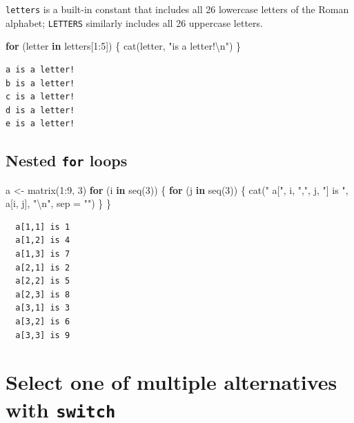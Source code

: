 \documentclass[
]{book}
\newenvironment{Shaded}{\begin{snugshade}}{\end{snugshade}}
\newcommand{\AttributeTok}[1]{\textcolor[rgb]{0.77,0.63,0.00}{#1}}
\newcommand{\ControlFlowTok}[1]{\textcolor[rgb]{0.13,0.29,0.53}{\textbf{#1}}}
\newcommand{\DecValTok}[1]{\textcolor[rgb]{0.00,0.00,0.81}{#1}}
\newcommand{\FunctionTok}[1]{\textcolor[rgb]{0.00,0.00,0.00}{#1}}
\newcommand{\NormalTok}[1]{#1}
\newcommand{\OtherTok}[1]{\textcolor[rgb]{0.56,0.35,0.01}{#1}}
\newcommand{\SpecialCharTok}[1]{\textcolor[rgb]{0.00,0.00,0.00}{#1}}
\newcommand{\StringTok}[1]{\textcolor[rgb]{0.31,0.60,0.02}{#1}}
\begin{document}
\texttt{letters} is a built-in constant that includes all 26 lowercase letters of the Roman alphabet; \texttt{LETTERS} similarly includes all 26 uppercase letters.

\begin{Shaded}
\begin{Highlighting}[]
\ControlFlowTok{for}\NormalTok{ (letter }\ControlFlowTok{in}\NormalTok{ letters[}\DecValTok{1}\SpecialCharTok{:}\DecValTok{5}\NormalTok{]) \{}
  \FunctionTok{cat}\NormalTok{(letter, }\StringTok{"is a letter!}\SpecialCharTok{\textbackslash{}n}\StringTok{"}\NormalTok{)}
\NormalTok{\}}
\end{Highlighting}
\end{Shaded}

\begin{verbatim}
a is a letter!
b is a letter!
c is a letter!
d is a letter!
e is a letter!
\end{verbatim}

\hypertarget{nested-for-loops}{%
\subsection{\texorpdfstring{Nested \texttt{for} loops}{Nested for loops}}\label{nested-for-loops}}

\begin{Shaded}
\begin{Highlighting}[]
\NormalTok{a }\OtherTok{\textless{}{-}} \FunctionTok{matrix}\NormalTok{(}\DecValTok{1}\SpecialCharTok{:}\DecValTok{9}\NormalTok{, }\DecValTok{3}\NormalTok{)}
\ControlFlowTok{for}\NormalTok{ (i }\ControlFlowTok{in} \FunctionTok{seq}\NormalTok{(}\DecValTok{3}\NormalTok{)) \{}
  \ControlFlowTok{for}\NormalTok{ (j }\ControlFlowTok{in} \FunctionTok{seq}\NormalTok{(}\DecValTok{3}\NormalTok{)) \{}
    \FunctionTok{cat}\NormalTok{(}\StringTok{"  a["}\NormalTok{, i, }\StringTok{","}\NormalTok{, j, }\StringTok{"] is "}\NormalTok{, a[i, j], }\StringTok{"}\SpecialCharTok{\textbackslash{}n}\StringTok{"}\NormalTok{, }\AttributeTok{sep =} \StringTok{""}\NormalTok{)}
\NormalTok{  \}}
\NormalTok{\}}
\end{Highlighting}
\end{Shaded}

\begin{verbatim}
  a[1,1] is 1
  a[1,2] is 4
  a[1,3] is 7
  a[2,1] is 2
  a[2,2] is 5
  a[2,3] is 8
  a[3,1] is 3
  a[3,2] is 6
  a[3,3] is 9
\end{verbatim}

\hypertarget{select-one-of-multiple-alternatives-with-switch}{%
\section{\texorpdfstring{Select one of multiple alternatives with \texttt{switch}}{Select one of multiple alternatives with switch}}\label{select-one-of-multiple-alternatives-with-switch}}
\end{document}
